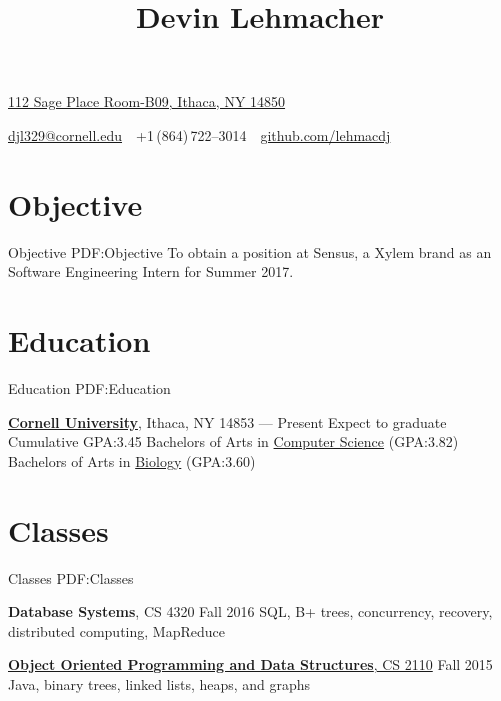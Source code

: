 \documentclass[letterpaper,10pt,oneside]{simpleresume}
\newcommand{\CVAuthor}{Devin Lehmacher}
\newcommand{\CVCompany}{Sensus, a Xylem brand}
\newcommand{\CVWebpage}{github.com/lehmacdj}
\begin{document}
\begin{minipage}[t][0pt]{\linewidth}
\pagestyle{empty}

\title{\CVAuthor}

\begin{subtitle}
\href{https://www.google.com/maps/place/112+Sage+Pl+Room-B09,+Ithaca,+NY+14850}
{112 Sage Place Room-B09, Ithaca, NY 14850}
\par
\href{mailto:djl329@cornell.edu}
{djl329@cornell.edu}
\,\SubBulletSymbol\,
+1\,(864)\,722--3014
\,\SubBulletSymbol\,
\href{https://\CVWebpage}
{\CVWebpage}
\end{subtitle}

\begin{body}

\section%
{Objective}
{Objective}
{PDF:Objective}
To obtain a position at \CVCompany{} as an Software Engineering Intern for
Summer 2017.

\section%
{Education}
{Education}
{PDF:Education}

\href{https://www.cornell.edu}
{\textbf{Cornell University}},
Ithaca, NY 14853
\hfill
{} --- Present
\BulletItem%
Expect to graduate 
\BulletItem%
Cumulative GPA:\@ 3.45
\BulletItem%
Bachelors of Arts in
\href{https://www.cs.cornell.edu}{Computer Science}
(GPA:\@ 3.82)
\BulletItem%
Bachelors of Arts in
\href{https://www.biology.cornell.edu}{Biology}
(GPA:\@ 3.60)

\section%
{Classes}
{Classes}
{PDF:Classes}

\textbf{Database Systems}, CS 4320
\hfill Fall 2016
\BulletItem%
SQL, B+ trees, concurrency, recovery, distributed computing, MapReduce

\href{https://www.cs.cornell.edu/courses/cs2110/2015fa/}
{\textbf{Object Oriented Programming and Data Structures}, CS 2110}
\hfill Fall 2015
\BulletItem%
Java, binary trees, linked lists, heaps, and graphs


\end{body}
\end{minipage}
\end{document}
